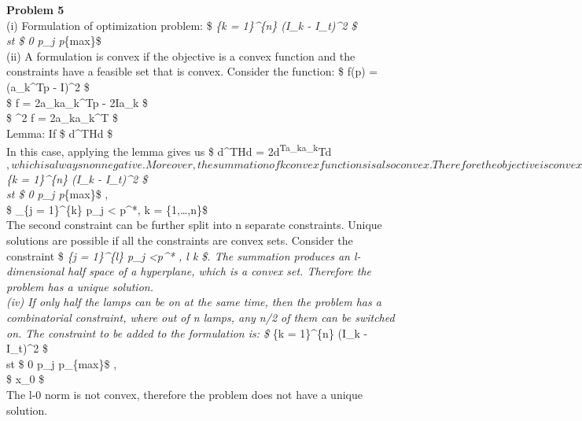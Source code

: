 \documentclass[11pt]{article}
\def\lt{<}
\begin{document}
\textbf{Problem 5}\\
(i) Formulation of optimization problem: \$
 \sum\emph{\{k = 1\}\^{}\{n\} (I\_k -
I\_t)\^{}2 \$\\
st \$ 0 \le p\_j \le p}\{max\}\$\\
(ii) A formulation is convex if the objective is a convex function and
the constraints have a feasible set that is convex. Consider the
function: \$ f(p) = (a\_k\^{}Tp - I)\^{}2 \$\\
\$ \nabla f = 2a\_ka\_k\^{}Tp - 2Ia\_k \$\\
\$ \nabla \^{}2 f = 2a\_ka\_k\^{}T \$\\
Lemma: If \$ d\^{}THd   
 \$\\
In this case, applying the lemma gives us \$ d\^{}THd =
2d\textsuperscript{Ta\_ka\_k}Td
\(, which is always non negative. Moreover, the summation of k convex functions is also convex. Therefore the objective is convex. The feasible set from the constraints is convex because they form a segmented space that is a hypercube. \
(iii) If we require the power output of any of the n lamps to be less than p*, the modified optimization problem is: \
\)  \sum\emph{\{k = 1\}\^{}\{n\} (I\_k
- I\_t)\^{}2 \$\\
st \$ 0 \le p\_j \le p}\{max\}\$ ,\\
\$ \sum\_\{j = 1\}\^{}\{k\} p\_j \textless{} p\^{}*, k =
\{1,\ldots,n\}\$\\
The second constraint can be further split into n separate constraints.
Unique solutions are possible if all the constraints are convex sets.
Consider the constraint \$ \sum\emph{\{j = 1\}\^{}\{l\} p\_j \lt p\^{}*
, l \epsilon k \$. The summation produces an l-dimensional half space of
a hyperplane, which is a convex set. Therefore the problem has a unique
solution.\\
(iv) If only half the lamps can be on at the same time, then the problem
has a combinatorial constraint, where out of n lamps, any n/2 of them
can be switched on. The constraint to be added to the formulation is: \$
\underset{p_j}{\operatorname{min}} \sum}\{k = 1\}\^{}\{n\} (I\_k -
I\_t)\^{}2 \$\\
st \$ 0 \le p\_j \le p\_\{max\}\$ ,\\
\$ \textbar\textbar x\textbar\textbar\_0 \le {} \$\\
The l-0 norm is not convex, therefore the problem does not have a unique
solution.
\end{document}
